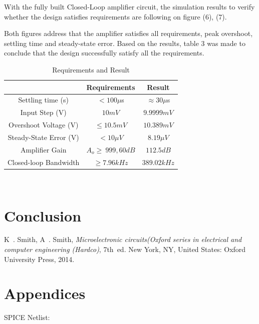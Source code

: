\documentclass[conference,compsoc]{IEEEtran}
\begin{document}
With the fully built Closed-Loop amplifier circuit, the simulation results to verify whether the design satisfies requirements are following on figure (6), (7).


Both figures address that the amplifier satisfies all requirements, peak overshoot, settling time and steady-state error.  Based on the results, table 3 was made to conclude that the design successfully satisfy all the requirements.\\
\begin{table}[!hbt]
	\centering
	\begin{tabular}{|c|c|c|}
	\hline
	&Requirements&Result\\
	\hline	
	Settling time (s) & \(< 100 \mu \)s & \(\approx 30\mu \)s \\
	Input Step (V) & \(10 mV\)&\(9.9999mV\)\\
	Overshoot Voltage (V) & \(\leq 10.5 mV\)&\(10.389 mV\)\\
	Steady-State Error (V) & \(<10 \mu V\)&\(8.19\mu V\)\\
	Amplifier Gain & \(A_o \geq\ 999, 60 dB\)&\(112.5dB\)\\
	Closed-loop Bandwidth & \(\geq 7.96 kHz\)&\(389.02kHz\)\\
	\hline
	\end{tabular}
	\caption{Requirements and Result}\label{table: 3}
\end{table}\\
\section{Conclusion}

\begin{thebibliography}{1}

K~. Smith, A~. Smith, \emph{Microelectronic circuits(Oxford series in electrical and computer engineering (Hardco)}, 7th~ed. New York, NY, United States: Oxford University Press, 2014.

\end{thebibliography}

\onecolumn

\section{Appendices}
\noindent SPICE Netlist:\\
\begin{lstlisting}


\end{lstlisting}
\end{document}
